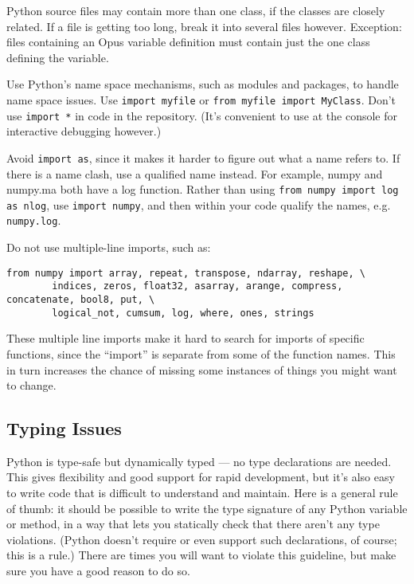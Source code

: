 Python source files may contain more than one class, if the classes are
closely related.  If a file is getting too long, break it into several
files however.  Exception: files containing an Opus variable definition
must contain just the one class defining the variable.

Use Python's name space mechanisms, such as modules and packages, to handle
name space issues.  Use \verb|import myfile| or
\verb|from myfile import MyClass|.  Don't use \verb|import *| in code in
the repository.  (It's convenient to use at the console for interactive debugging
however.)

Avoid \verb|import as|, since it makes it harder to figure out what a name
refers to.  If there is a name clash, use a qualified name
instead.  For example, numpy and numpy.ma both have a log
function.  Rather than
using \verb|from numpy import log as nlog|,
use \verb|import numpy|, and then within your code qualify the names, e.g.
\verb|numpy.log|.

Do not use multiple-line imports, such as:

\numpyindex
\begin{verbatim}
from numpy import array, repeat, transpose, ndarray, reshape, \
        indices, zeros, float32, asarray, arange, compress, concatenate, bool8, put, \
        logical_not, cumsum, log, where, ones, strings
\end{verbatim}

These multiple line imports make it hard to search for imports of specific functions,
since the ``import'' is separate from some of the function names.  This in turn
increases the chance of missing some instances of things you might want to change.

\subsection{Typing Issues}

Python  is type-safe but dynamically typed --- no type declarations are
needed.  This gives flexibility and good support for rapid development, but
it's also easy to write code that is difficult to understand and maintain.
Here is a general rule of thumb: it should be possible to write the type
signature of any Python variable or method, in a way that lets you
statically check that there aren't any type violations.  (Python doesn't
require or even support such declarations, of course; this is a rule.)
There are times you will want to violate this guideline, but make sure you
have a good reason to do so.

